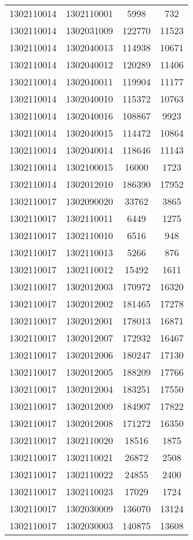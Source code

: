 \begin{longtable}[h]{llcc}
		1302110014 & 1302110001 & 5998 & 732\\
		1302110014 & 1302031009 & 122770 & 11523\\
		1302110014 & 1302040013 & 114938 & 10671\\
		1302110014 & 1302040012 & 120289 & 11406\\
		1302110014 & 1302040011 & 119904 & 11177\\
		1302110014 & 1302040010 & 115372 & 10763\\
		1302110014 & 1302040016 & 108867 & 9923\\
		1302110014 & 1302040015 & 114472 & 10864\\
		1302110014 & 1302040014 & 118646 & 11143\\
		1302110014 & 1302100015 & 16000 & 1723\\
		1302110014 & 1302012010 & 186390 & 17952\\
		1302110017 & 1302090020 & 33762 & 3865\\
		1302110017 & 1302110011 & 6449 & 1275\\
		1302110017 & 1302110010 & 6516 & 948\\
		1302110017 & 1302110013 & 5266 & 876\\
		1302110017 & 1302110012 & 15492 & 1611\\
		1302110017 & 1302012003 & 170972 & 16320\\
		1302110017 & 1302012002 & 181465 & 17278\\
		1302110017 & 1302012001 & 178013 & 16871\\
		1302110017 & 1302012007 & 172932 & 16467\\
		1302110017 & 1302012006 & 180247 & 17130\\
		1302110017 & 1302012005 & 188209 & 17766\\
		1302110017 & 1302012004 & 183251 & 17550\\
		1302110017 & 1302012009 & 184907 & 17822\\
		1302110017 & 1302012008 & 171272 & 16350\\
		1302110017 & 1302110020 & 18516 & 1875\\
		1302110017 & 1302110021 & 26872 & 2508\\
		1302110017 & 1302110022 & 24855 & 2400\\
		1302110017 & 1302110023 & 17029 & 1724\\
		1302110017 & 1302030009 & 136070 & 13124\\
		1302110017 & 1302030003 & 140875 & 13608\\

\end{longtable}
